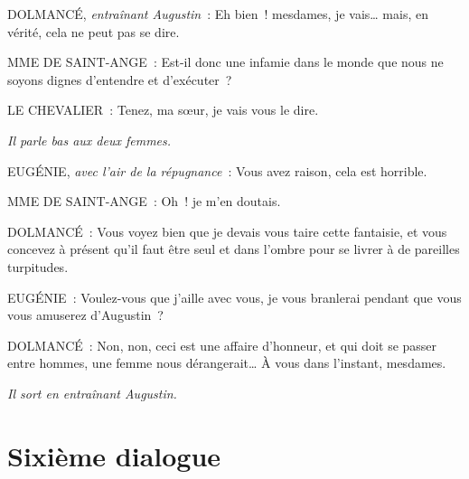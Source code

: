 \documentclass[french,twoside]{book} %
\begin{document}
DOLMANCÉ, {\itshape entraînant Augustin} : Eh bien ! mesdames, je vais… mais, en vérité, cela ne peut pas se dire.\par
MME DE SAINT-ANGE : Est-il donc une infamie dans le monde que nous ne soyons dignes d’entendre et d’exécuter ?\par
LE CHEVALIER : Tenez, ma sœur, je vais vous le dire.\par
{\itshape Il parle bas aux deux femmes.}\par
EUGÉNIE, {\itshape avec l’air de la répugnance} : Vous avez raison, cela est horrible.\par
MME DE SAINT-ANGE : Oh ! je m’en doutais.\par
DOLMANCÉ : Vous voyez bien que je devais vous taire cette fantaisie, et vous concevez à présent qu’il faut être seul et dans l’ombre pour se livrer à de pareilles turpitudes.\par
EUGÉNIE : Voulez-vous que j’aille avec vous, je vous branlerai pendant que vous vous amuserez d’Augustin ?\par
DOLMANCÉ : Non, non, ceci est une affaire d’honneur, et qui doit se passer entre hommes, une femme nous dérangerait… À vous dans l’instant, mesdames.\par
{\itshape Il sort en entraînant Augustin.}
\section[{Sixième dialogue}]{Sixième dialogue}
\label{d6}\renewcommand{\leftmark}{Sixième dialogue}
\end{document}
